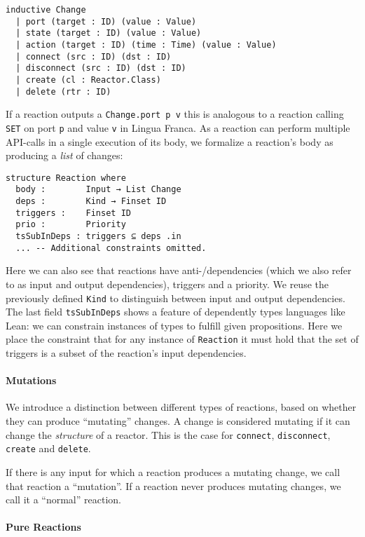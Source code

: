 \begin{lstlisting}
inductive Change
  | port (target : ID) (value : Value)
  | state (target : ID) (value : Value)
  | action (target : ID) (time : Time) (value : Value)
  | connect (src : ID) (dst : ID)
  | disconnect (src : ID) (dst : ID)
  | create (cl : Reactor.Class)
  | delete (rtr : ID)
\end{lstlisting}

If a reaction outputs a \lstinline{Change.port p v} this is analogous to a reaction calling \verb|SET| on port \verb|p| and value \verb|v| in Lingua Franca.
As a reaction can perform multiple API-calls in a single execution of its body, we formalize a reaction's body as producing a \emph{list} of changes:

\begin{lstlisting}
structure Reaction where
  body :        Input → List Change
  deps :        Kind → Finset ID
  triggers :    Finset ID
  prio :        Priority
  tsSubInDeps : triggers ⊆ deps .in
  ... -- Additional constraints omitted.
\end{lstlisting}

Here we can also see that reactions have anti-/dependencies (which we also refer to as input and output dependencies), triggers and a priority.
We reuse the previously defined \lstinline{Kind} to distinguish between input and output dependencies.
The last field \lstinline{tsSubInDeps} shows a feature of dependently types languages like Lean: we can constrain instances of types to fulfill given propositions.
Here we place the constraint that for any instance of \lstinline{Reaction} it must hold that the set of triggers is a subset of the reaction's input dependencies.

\paragraph{Mutations}

We introduce a distinction between different types of reactions, based on whether they can produce ``mutating'' changes.
A change is considered mutating if it can change the \emph{structure} of a reactor.
This is the case for \lstinline{connect}, \lstinline{disconnect}, \lstinline{create} and \lstinline{delete}.

If there is any input for which a reaction produces a mutating change, we call that reaction a ``mutation''.
If a reaction never produces mutating changes, we call it a ``normal'' reaction.

\paragraph{Pure Reactions}

